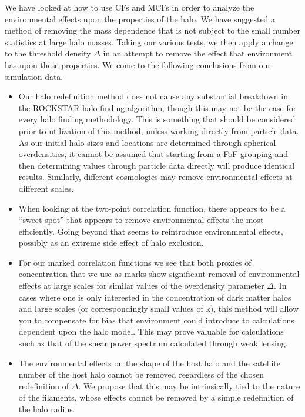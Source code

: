 \documentclass[usenatbib]{mnras}
\begin{document}
We have looked at how to use CFs and MCFs in order to analyze the environmental effects upon the properties of the halo. We have suggested a method of removing the mass dependence that is not subject to the small number statistics at large halo masses. Taking our various tests, we then apply a change to the threshold density $\Delta$ in an attempt to remove the effect that environment has upon these properties. We come to the following conclusions from our simulation data.

\begin{itemize}
	\item Our halo redefinition method does not cause any substantial breakdown in the ROCKSTAR halo finding
algorithm, though this may not be the case for every halo finding methodology. This is something that should be
considered prior to utilization of this method, unless working directly from particle data. As our initial halo
sizes and locations are determined through spherical overdensities, it cannot be assumed that starting from a FoF
grouping and then determining values through particle data directly will produce identical results. Similarly,
different cosmologies may remove environmental effects at different scales.

	\item When looking at the two-point correlation function, there appears to be a ``sweet spot'' that appears
to remove environmental effects the most efficiently. Going beyond that seems to reintroduce environmental
effects, possibly as an extreme side effect of halo exclusion.

	\item For our marked correlation functions we see that both proxies of concentration that we use as marks
show significant removal of environmental effects at large scales for similar values of the overdensity parameter
$\Delta$. In cases where one is only interested in the concentration of dark matter halos and large scales (or
correspondingly small values of k), this method will allow you to compensate for bias that environment could
introduce to calculations dependent upon the halo model. This may prove valuable for calculations such as that of
the shear power spectrum calculated through weak lensing.

	\item The environmental effects on the shape of the host halo and the satellite number of the host halo
cannot be removed regardless of the chosen redefinition of $\Delta$. We propose that this may be intrinsically
tied to the nature of the filaments, whose effects cannot be removed by a simple redefinition of the halo radius.


\end{itemize}
\end{document}
